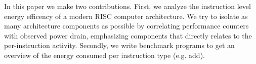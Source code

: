 In this paper we make two contributions. First, we analyze the instruction level
energy efficency of a modern RISC computer architecture. We try to isolate as
many architecture components as possible by correlating performance counters
with observed power drain, emphasizing components that directly relates to the
per-instruction activity. Secondly, we write benchmark programs to get an
overview of the energy consumed per instruction type (e.g. \textrm{add}).



